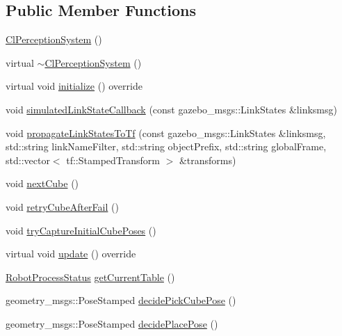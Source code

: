 \subsection*{Public Member Functions}
\begin{DoxyCompactItemize}
\item 
\hyperlink{classsm__moveit__3_1_1cl__perception__system_1_1ClPerceptionSystem_ac1dddfec27472a71d16f1a34b66eee5d}{Cl\+Perception\+System} ()
\item 
virtual \hyperlink{classsm__moveit__3_1_1cl__perception__system_1_1ClPerceptionSystem_aadecbe44e1b17fd49743c57ee456b43f}{$\sim$\+Cl\+Perception\+System} ()
\item 
virtual void \hyperlink{classsm__moveit__3_1_1cl__perception__system_1_1ClPerceptionSystem_a852bf07fda7da87e7bb4ad9336e25042}{initialize} () override
\item 
void \hyperlink{classsm__moveit__3_1_1cl__perception__system_1_1ClPerceptionSystem_a540c3a50c29e6ec58f6fcd7e993d9dff}{simulated\+Link\+State\+Callback} (const gazebo\+\_\+msgs\+::\+Link\+States \&linksmsg)
\item 
void \hyperlink{classsm__moveit__3_1_1cl__perception__system_1_1ClPerceptionSystem_a1084d40600fb5764c48447877a3683ef}{propagate\+Link\+States\+To\+Tf} (const gazebo\+\_\+msgs\+::\+Link\+States \&linksmsg, std\+::string link\+Name\+Filter, std\+::string object\+Prefix, std\+::string global\+Frame, std\+::vector$<$ tf\+::\+Stamped\+Transform $>$ \&transforms)
\item 
void \hyperlink{classsm__moveit__3_1_1cl__perception__system_1_1ClPerceptionSystem_a35d80131bec4a63ab939667865e7d08d}{next\+Cube} ()
\item 
void \hyperlink{classsm__moveit__3_1_1cl__perception__system_1_1ClPerceptionSystem_a06bf8ed0f64662a6dde713f5678476f5}{retry\+Cube\+After\+Fail} ()
\item 
void \hyperlink{classsm__moveit__3_1_1cl__perception__system_1_1ClPerceptionSystem_a211e752ccac5163bc775fa426c0d188d}{try\+Capture\+Initial\+Cube\+Poses} ()
\item 
virtual void \hyperlink{classsm__moveit__3_1_1cl__perception__system_1_1ClPerceptionSystem_a53ce2f7a00275f8c1ce4a0e640bbe3d8}{update} () override
\item 
\hyperlink{namespacesm__moveit__3_1_1cl__perception__system_a627f57ce4b1b2a0daa56d1b3c51c37ec}{Robot\+Process\+Status} \hyperlink{classsm__moveit__3_1_1cl__perception__system_1_1ClPerceptionSystem_a6abfb0c37f72ea92986d3d007f668dbb}{get\+Current\+Table} ()
\item 
geometry\+\_\+msgs\+::\+Pose\+Stamped \hyperlink{classsm__moveit__3_1_1cl__perception__system_1_1ClPerceptionSystem_accc2813b1da308e9a71bec317db4590d}{decide\+Pick\+Cube\+Pose} ()
\item 
geometry\+\_\+msgs\+::\+Pose\+Stamped \hyperlink{classsm__moveit__3_1_1cl__perception__system_1_1ClPerceptionSystem_a0ee47269c0aacdced77b9bbe9577499d}{decide\+Place\+Pose} ()
\end{DoxyCompactItemize}
